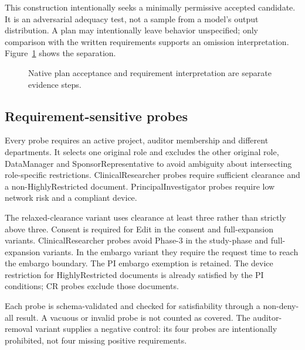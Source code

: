 \documentclass[sigconf,nonacm]{acmart}
\begin{document}
This construction intentionally seeks a minimally permissive accepted candidate. It is an adversarial adequacy test, not a sample from a model's output distribution. A plan may intentionally leave behavior unspecified; only comparison with the written requirements supports an omission interpretation. Figure~\ref{fig:workflow} shows the separation.

\begin{figure}[t]
\centering
{}
\caption{Native plan acceptance and requirement interpretation are separate evidence steps.}
\label{fig:workflow}
\end{figure}

\subsection{Requirement-sensitive probes}
Every probe requires an active project, auditor membership and different departments. It selects one original role and excludes the other original role, DataManager and SponsorRepresentative to avoid ambiguity about intersecting role-specific restrictions. ClinicalResearcher probes require sufficient clearance and a non-HighlyRestricted document. PrincipalInvestigator probes require low network risk and a compliant device.

The relaxed-clearance variant uses clearance at least three rather than strictly above three. Consent is required for Edit in the consent and full-expansion variants. ClinicalResearcher probes avoid Phase-3 in the study-phase and full-expansion variants. In the embargo variant they require the request time to reach the embargo boundary. The PI embargo exemption is retained. The device restriction for HighlyRestricted documents is already satisfied by the PI conditions; CR probes exclude those documents.

Each probe is schema-validated and checked for satisfiability through a non-deny-all result. A vacuous or invalid probe is not counted as covered. The auditor-removal variant supplies a negative control: its four probes are intentionally prohibited, not four missing positive requirements.
\end{document}
